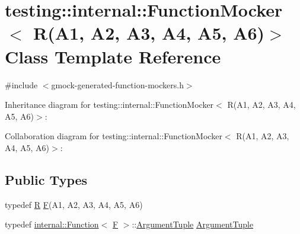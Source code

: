 \hypertarget{classtesting_1_1internal_1_1_function_mocker_3_01_r_07_a1_00_01_a2_00_01_a3_00_01_a4_00_01_a5_00_01_a6_08_4}{}\section{testing\+:\+:internal\+:\+:Function\+Mocker$<$ R(A1, A2, A3, A4, A5, A6)$>$ Class Template Reference}
\label{classtesting_1_1internal_1_1_function_mocker_3_01_r_07_a1_00_01_a2_00_01_a3_00_01_a4_00_01_a5_00_01_a6_08_4}


{\ttfamily \#include $<$gmock-\/generated-\/function-\/mockers.\+h$>$}



Inheritance diagram for testing\+:\+:internal\+:\+:Function\+Mocker$<$ R(A1, A2, A3, A4, A5, A6)$>$\+:


Collaboration diagram for testing\+:\+:internal\+:\+:Function\+Mocker$<$ R(A1, A2, A3, A4, A5, A6)$>$\+:
\subsection*{Public Types}
\begin{DoxyCompactItemize}
\item 
typedef \hyperlink{typedefs__9_8js_afb423b73ee7b6c04d2d54fc06e405404}{R} \hyperlink{classtesting_1_1internal_1_1_function_mocker_3_01_r_07_a1_00_01_a2_00_01_a3_00_01_a4_00_01_a5_00_01_a6_08_4_a5373cd66051f0a54e83b0497004df058}{F}(A1, A2, A3, A4, A5, A6)
\item 
typedef \hyperlink{structtesting_1_1internal_1_1_function}{internal\+::\+Function}$<$ \hyperlink{classtesting_1_1internal_1_1_function_mocker_3_01_r_07_a1_00_01_a2_00_01_a3_00_01_a4_00_01_a5_00_01_a6_08_4_a5373cd66051f0a54e83b0497004df058}{F} $>$\+::\hyperlink{classtesting_1_1internal_1_1_function_mocker_3_01_r_07_a1_00_01_a2_00_01_a3_00_01_a4_00_01_a5_00_01_a6_08_4_a0c8bc671adc8e67e8a49a01432407139}{Argument\+Tuple} \hyperlink{classtesting_1_1internal_1_1_function_mocker_3_01_r_07_a1_00_01_a2_00_01_a3_00_01_a4_00_01_a5_00_01_a6_08_4_a0c8bc671adc8e67e8a49a01432407139}{Argument\+Tuple}
\end{DoxyCompactItemize}
